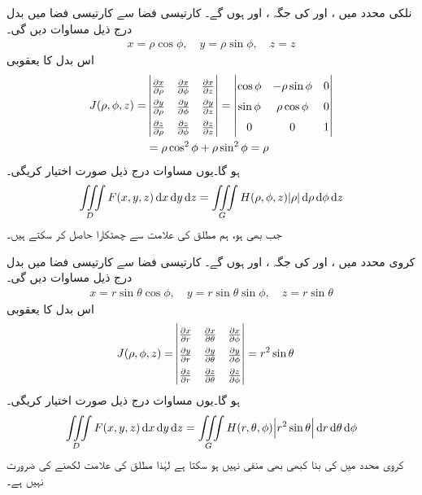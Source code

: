 نلکی محدد میں ،  اور   کی جگہ ،  اور  ہوں گے۔ کارتیسی  فضا سے کارتیسی  فضا میں بدل درج ذیل مساوات دیں گی۔
\begin{align*}
x=\rho\cos\phi,\quad y=\rho\sin\phi,\quad z=z
\end{align*}   
اس بدل کا یعقوبی
\begin{align*}
\renewcommand{\arraystretch}{1.5}
J(\rho,\phi,z)=&\begin{vmatrix}
\frac{\partial x}{\partial \rho}&\frac{\partial x}{\partial \phi}&\frac{\partial x}{\partial z}\\
\frac{\partial y}{\partial \rho}&\frac{\partial y}{\partial \phi}&\frac{\partial y}{\partial z}\\
\frac{\partial z}{\partial \rho}&\frac{\partial z}{\partial \phi}&\frac{\partial z}{\partial z}
\end{vmatrix}=\begin{vmatrix} 
\cos\phi&-\rho\sin\phi&0\\
\sin\phi&\rho\cos\phi&0\\
0&0&1
 \end{vmatrix}\\
&=\rho\cos^2\phi+\rho\sin^2\phi=\rho
\end{align*}
ہو گا۔یوں مساوات  درج ذیل صورت  اختیار کریگی۔
 \begin{align}
\iiint\limits_D F(x,y,z)\dif x\dif y\dif z=\iiint\limits_G H(\rho,\phi,z)\abs{\rho}\dif \rho\dif \phi\dif z
\end{align}
    جب بھی  ہو، ہم  مطلق کی علامت سے چھٹکارا حاصل کر سکتے ہیں۔ 


کروی  محدد میں ،  اور   کی جگہ ،  اور  ہوں گے۔ کارتیسی  فضا سے کارتیسی  فضا میں بدل درج ذیل مساوات دیں گی۔
\begin{align*}
x=r\sin\theta\cos\phi,\quad y=r\sin\theta\sin\phi,\quad z=r\sin\theta
\end{align*}   
اس بدل کا یعقوبی
\begin{align*}
\renewcommand{\arraystretch}{1.5}
J(\rho,\phi,z)=&\begin{vmatrix}
\frac{\partial x}{\partial r}&\frac{\partial x}{\partial \theta}&\frac{\partial x}{\partial \phi}\\
\frac{\partial y}{\partial r}&\frac{\partial y}{\partial \theta}&\frac{\partial y}{\partial \phi}\\
\frac{\partial z}{\partial r}&\frac{\partial z}{\partial \theta}&\frac{\partial z}{\partial \phi}
\end{vmatrix}=r^2\sin\theta
\end{align*}
ہو گا۔یوں مساوات  درج ذیل صورت  اختیار کریگی۔
 \begin{align}
\iiint\limits_D F(x,y,z)\dif x\dif y\dif z=\iiint\limits_G H(r,\theta,\phi)\abs{r^2\sin\theta}\dif r\dif \theta\dif \phi
\end{align}
 کروی محدد میں  کی بنا    کبھی بھی منفی نہیں ہو  سکتا   ہے  لہٰذا مطلق کی علامت لکھنے کی ضرورت نہیں ہے۔ 

